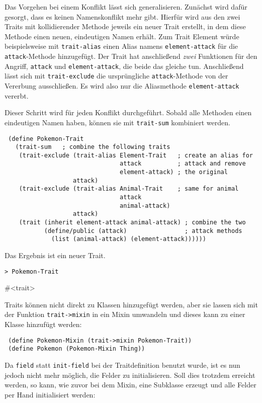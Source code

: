 Das Vorgehen bei einem Konflikt lässt sich generalisieren. Zunächst wird dafür gesorgt, dass es keinen Namenskonflikt mehr gibt. Hierfür wird aus den zwei Traits mit kollidierender Methode jeweils ein neuer Trait erstellt, in dem diese Methode einen neuen, eindeutigen Namen erhält. Zum Trait Element würde beispielsweise mit \texttt{trait-alias} einen Alias namens \texttt{element-attack} für die \texttt{attack}-Methode hinzugefügt. Der Trait hat anschließend \emph{zwei} Funktionen für den Angriff, \texttt{attack} und \texttt{element-attack}, die beide das gleiche tun. Anschließend lässt sich mit \texttt{trait-exclude} die ursprüngliche \texttt{attack}-Methode von der Vererbung ausschließen. Es wird also nur die Aliasmethode \texttt{element-attack} vererbt.

Dieser Schritt wird für jeden Konflikt durchgeführt. Sobald alle Methoden einen eindeutigen Namen haben, können sie mit \texttt{trait-sum} kombiniert werden.

\begin{lstlisting}
 (define Pokemon-Trait
   (trait-sum   ; combine the following traits
    (trait-exclude (trait-alias Element-Trait   ; create an alias for
                                attack          ; attack and remove
                                element-attack) ; the original
                   attack)
    (trait-exclude (trait-alias Animal-Trait    ; same for animal
                                attack         
                                animal-attack)
                   attack)
    (trait (inherit element-attack animal-attack) ; combine the two
           (define/public (attack)                ; attack methods
             (list (animal-attack) (element-attack))))))
\end{lstlisting}

Das Ergebnis ist ein neuer Trait. 

\begin{lstlisting}
> Pokemon-Trait
\end{lstlisting}
{\routput \#<trait>}

Traits können nicht direkt zu Klassen hinzugefügt werden, aber sie lassen sich mit der Funktion \texttt{trait->mixin} in ein Mixin umwandeln und dieses kann zu einer Klasse hinzufügt werden:

\begin{lstlisting}
 (define Pokemon-Mixin (trait->mixin Pokemon-Trait))
 (define Pokemon (Pokemon-Mixin Thing))
\end{lstlisting}

Da \texttt{field} statt \texttt{init-field} bei der Traitdefinition benutzt wurde, ist es nun jedoch nicht mehr möglich, die Felder zu initialisieren. Soll dies trotzdem erreicht werden, so kann, wie zuvor bei dem Mixin, eine Subklasse erzeugt und alle Felder per Hand initialisiert werden:

